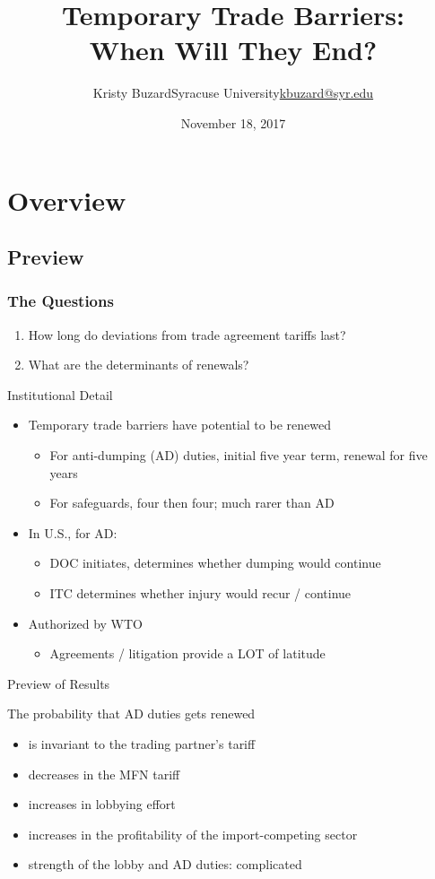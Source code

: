\documentclass[handout]{beamer}
\title[Temporary Trade Barriers: When Will They End?\hspace{2.35in}\insertframenumber/\inserttotalframenumber]{Temporary Trade Barriers: \\ When Will They End?}
\author[Kristy Buzard]{\texorpdfstring{Kristy Buzard\newline Syracuse University\newline\url{kbuzard@syr.edu}}{Kristy Buzard}}
\date{November 18, 2017}
\begin{document}
\maketitle




\section{Overview}
\subsection{Preview}
\begin{frame}
\frametitle{The Questions}
\pause
\begin{enumerate}[<+->]
	\item How long do deviations from trade agreement tariffs last? 
  \item What are the determinants of renewals?
\end{enumerate}
\end{frame}


\begin{frame}{Institutional Detail}
\begin{itemize}[<+->]
	\item Temporary trade barriers have potential to be renewed
		\begin{itemize}
			\item For anti-dumping (AD) duties, initial five year term, renewal for five years
			\item For safeguards, four then four; much rarer than AD
		\end{itemize}
	\item In U.S., for AD:
		\begin{itemize}
			\item DOC initiates, determines whether dumping would continue
			\item ITC determines whether injury would recur / continue
		\end{itemize}
	\item Authorized by WTO
		\begin{itemize}
			\item Agreements / litigation provide a LOT of latitude
		\end{itemize}
\end{itemize}
\end{frame}

 
\begin{frame}{Preview of Results}

\pause
The probability that AD duties gets renewed
\pause
\begin{itemize}[<+->]
	\item is invariant to the trading partner's tariff
	\item decreases in the MFN tariff
	\item increases in lobbying effort	
	\item increases in the profitability of the import-competing sector
	\item strength of the lobby and AD duties: complicated
\end{itemize}
\end{frame}
\end{document}

